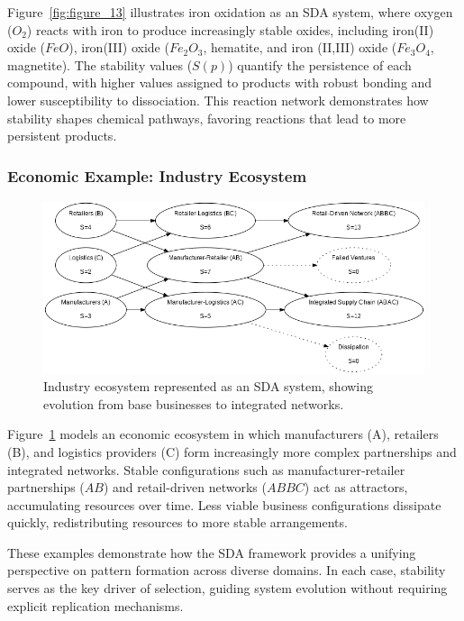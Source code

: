 \documentclass[preprint,12pt]{elsarticle}
\begin{document}
Figure~\ref{fig:figure_13} illustrates iron oxidation as an SDA system, where oxygen (\(O_2\)) reacts with iron to produce increasingly stable oxides, including iron(II) oxide (\(FeO\)), iron(III) oxide (\(Fe_2O_3\), hematite, and iron (II,III) oxide (\(Fe_3O_4\), magnetite). The stability values (\(S(p)\)) quantify the persistence of each compound, with higher values assigned to products with robust bonding and lower susceptibility to dissociation. This reaction network demonstrates how stability shapes chemical pathways, favoring reactions that lead to more persistent products.

\subsubsection{Economic Example: Industry Ecosystem}

\begin{figure}[h]
    \centering
    \includegraphics[width=1\textwidth]{figure_14.png}
    \caption{Industry ecosystem represented as an SDA system, showing evolution from base businesses to integrated networks.}
    \label{fig:figure_14}
\end{figure}

Figure~\ref{fig:figure_14} models an economic ecosystem in which manufacturers (A), retailers (B), and logistics providers (C) form increasingly more complex partnerships and integrated networks. Stable configurations such as manufacturer-retailer partnerships (\( AB \)) and retail-driven networks (\( ABBC \)) act as attractors, accumulating resources over time. Less viable business configurations dissipate quickly, redistributing resources to more stable arrangements.

These examples demonstrate how the SDA framework provides a unifying perspective on pattern formation across diverse domains. In each case, stability serves as the key driver of selection, guiding system evolution without requiring explicit replication mechanisms.
\end{document}
